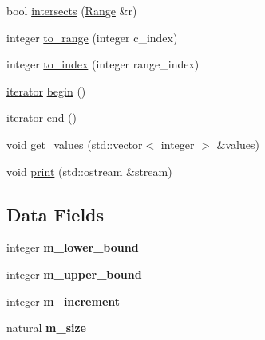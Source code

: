 \begin{DoxyCompactItemize}
\item 
bool \hyperlink{classez_1_1essential_1_1Range_aaf3723436b1129886589642f4b49213b}{intersects} (\hyperlink{classez_1_1essential_1_1Range}{Range} \&r)
\item 
integer \hyperlink{classez_1_1essential_1_1Range_a89f7d608969f4d59d713d88a44f3b60f}{to\+\_\+range} (integer c\+\_\+index)
\item 
integer \hyperlink{classez_1_1essential_1_1Range_a1ccac3c17a4cd0da27700f4e22419eee}{to\+\_\+index} (integer range\+\_\+index)
\item 
\hyperlink{classez_1_1essential_1_1Range_1_1iterator}{iterator} \hyperlink{classez_1_1essential_1_1Range_aa5ea39bc7f0f60da092106a91eaadadc}{begin} ()
\item 
\hyperlink{classez_1_1essential_1_1Range_1_1iterator}{iterator} \hyperlink{classez_1_1essential_1_1Range_a4342f09c49f0c17667f07602c930349d}{end} ()
\item 
void \hyperlink{classez_1_1essential_1_1Range_a257728a7783528ffa35b5f8158db90ec}{get\+\_\+values} (std\+::vector$<$ integer $>$ \&values)
\item 
void \hyperlink{classez_1_1essential_1_1Range_a6a05a1d19692f5a289e1cc3b2d62c1e6}{print} (std\+::ostream \&stream)
\end{DoxyCompactItemize}
\subsection*{Data Fields}
\begin{DoxyCompactItemize}
\item 
\mbox{\label{classez_1_1essential_1_1Range_af0959e0d23aaaa8253ec1dfc563e80d3}} 
integer {\bfseries m\+\_\+lower\+\_\+bound}
\item 
\mbox{\label{classez_1_1essential_1_1Range_ac7c5dd9ed1efa1a0b9e23930c5a79d62}} 
integer {\bfseries m\+\_\+upper\+\_\+bound}
\item 
\mbox{\label{classez_1_1essential_1_1Range_ae81878e4a6b9f2621523338d3b31bd5c}} 
integer {\bfseries m\+\_\+increment}
\item 
\mbox{\label{classez_1_1essential_1_1Range_a21f77cf12d8ad0f168333a35bbe78e0b}} 
natural {\bfseries m\+\_\+size}
\end{DoxyCompactItemize}
